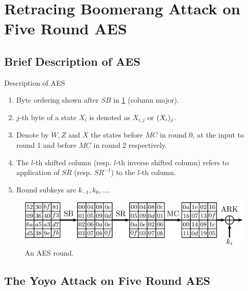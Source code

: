 \documentclass[notheorems]{beamer}
\theoremstyle{definition}
\theoremstyle{example}
\begin{document}
    \section[Application to AES]{Retracing Boomerang Attack on Five Round AES}
    \label{sec:retr-boomerang-aes}

    \subsection{Brief Description of AES}
    \label{subsec:aes-description}

    \begin{frame}{Description of AES}
        \begin{enumerate}[<+->]
            \item Byte ordering shown after \(SB\) in \cref{fig:aes} (column
            major).
            \item \(j\)-th byte of a state \(X_i\) is denoted as \(X_{i,j}\) or
            \((X_i)_j\).
            \item Denote by \(W, Z\) and \(X\) the states before \(MC\) in round
            0, at the input to round 1 and before \(MC\) in round 2
            respectively.
            \item The \(l\)-th shifted column (resp. \(l\)-th inverse shifted
            column) refers to application of \(SR\) (resp. \(SR^{-1}\)) to the
            \(l\)-th column.
            \item Round subkeys are \(k_{-1}, k_0, \ldots\).
        \end{enumerate}
        \begin{figure}[!ht]
            \centering
            \includegraphics[width=0.85\columnwidth]{images/aes.png}
            \caption{An AES round.}
            \label{fig:aes}
        \end{figure}
    \end{frame}

    \subsection{The Yoyo Attack on Five Round AES}
    \label{subsec:yoyo-aes}
\end{document}
